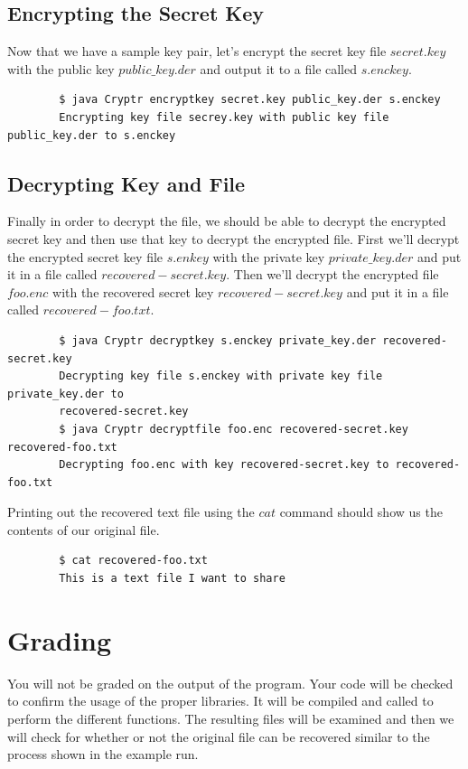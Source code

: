 \documentclass{article}
\begin{document}
\subsection*{Encrypting the Secret Key}
Now that we have a sample key pair, let's encrypt the secret key file $secret.key$ with the public key $public\_key.der$ and output it to a file called $s.enckey$. 
\begin{commandline}
	\begin{verbatim}
		$ java Cryptr encryptkey secret.key public_key.der s.enckey
		Encrypting key file secrey.key with public key file public_key.der to s.enckey
	\end{verbatim}
\end{commandline}


\subsection*{Decrypting Key and File}
Finally in order to decrypt the file, we should be able to decrypt the encrypted secret key and then use that key to decrypt the encrypted file. First we'll decrypt the encrypted secret key file $s.enkey$ with the private key $private\_key.der$ and put it in a file called $recovered-secret.key$. Then we'll decrypt the encrypted file $foo.enc$ with the recovered secret key $recovered-secret.key$ and put it in a file called $recovered-foo.txt$.
\begin{commandline}
	\begin{verbatim}
		$ java Cryptr decryptkey s.enckey private_key.der recovered-secret.key
		Decrypting key file s.enckey with private key file private_key.der to 
		recovered-secret.key
		$ java Cryptr decryptfile foo.enc recovered-secret.key recovered-foo.txt
		Decrypting foo.enc with key recovered-secret.key to recovered-foo.txt
	\end{verbatim}
\end{commandline}
Printing out the recovered text file using the $cat$ command should show us the contents of our original file. 
\begin{commandline}
	\begin{verbatim}
		$ cat recovered-foo.txt
		This is a text file I want to share
	\end{verbatim}
\end{commandline}

\section*{Grading}
You will not be graded on the output of the program. Your code will be checked to confirm the usage of the proper libraries. It will be compiled and called to perform the different functions. The resulting files will be examined and then we will check for whether or not the original file can be recovered similar to the process shown in the example run. 
\end{document}
